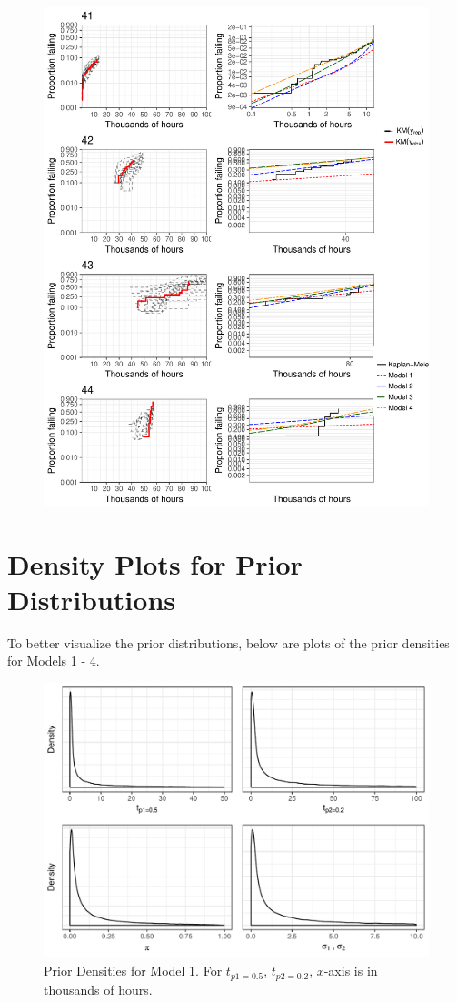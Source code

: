 \documentclass[12pt]{article}
\begin{document}
\begin{figure}[H]
\includegraphics[width=\textwidth]{ppcheck-v2-11.pdf}
\end{figure}
\clearpage


\section{Density Plots for Prior Distributions}
To better visualize the prior distributions, below are plots of
the prior densities for Models 1 - 4.
\begin{figure}[H]
\center
\includegraphics[width=\textwidth]{priorsmod1.pdf}
\caption{Prior Densities for Model 1.  For $t_{p1 = 0.5}$, $t_{p2 = 0.2}$, $x$-axis is in thousands of hours.}
\end{figure}
\end{document}
